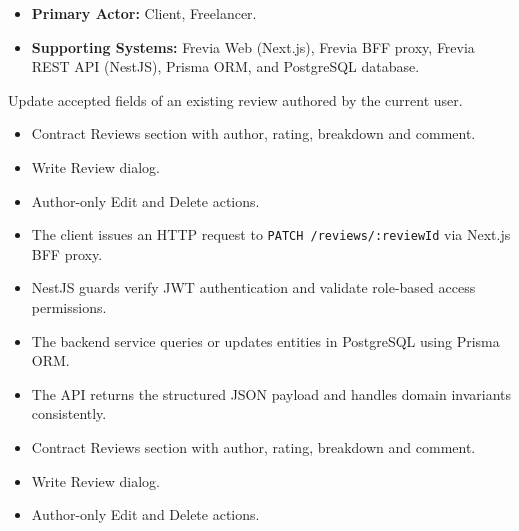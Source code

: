 
\begin{itemize}[leftmargin=1.6em,topsep=3pt,itemsep=2pt,parsep=0pt,label=$\bullet$]
    \item \textbf{Primary Actor:} Client, Freelancer.
    \item \textbf{Supporting Systems:} Frevia Web (Next.js), Frevia BFF proxy, Frevia REST API (NestJS), Prisma ORM, and PostgreSQL database.
\end{itemize}

\noindent Update accepted fields of an existing review authored by the current user.

\begin{itemize}[leftmargin=1.6em,topsep=3pt,itemsep=2pt,parsep=0pt,label=$\bullet$]
    \item Contract Reviews section with author, rating, breakdown and comment.
    \item Write Review dialog.
    \item Author-only Edit and Delete actions.
\end{itemize}

\begin{itemize}[leftmargin=1.6em,topsep=3pt,itemsep=2pt,parsep=0pt,label=$\bullet$]
    \item The client issues an HTTP request to \texttt{PATCH /\allowbreak{}reviews/\allowbreak{}:\allowbreak{}reviewId} via Next.js BFF proxy.
    \item NestJS guards verify JWT authentication and validate role-based access permissions.
    \item The backend service queries or updates entities in PostgreSQL using Prisma ORM.
    \item The API returns the structured JSON payload and handles domain invariants consistently.
\end{itemize}

\begin{itemize}[leftmargin=1.6em,topsep=3pt,itemsep=2pt,parsep=0pt,label=$\bullet$]
    \item Contract Reviews section with author, rating, breakdown and comment.
    \item Write Review dialog.
    \item Author-only Edit and Delete actions.
\end{itemize}


